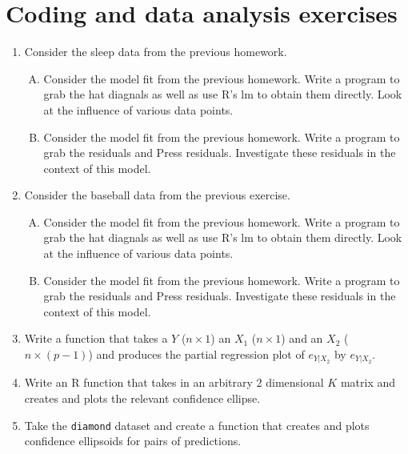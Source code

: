 \documentclass[12pt]{article}
\begin{document}
\section{Coding and data analysis exercises}
\begin{enumerate}
	\item Consider the sleep data from the previous homework.
	\begin{enumerate}[A.]
 		\item Consider the model fit from the previous homework. Write a program to grab the hat diagnals as well as use R's lm to obtain them directly. 
 			Look at the influence of various data points.
		\item Consider the model fit from the previous homework. Write a program to grab the residuals and Press residuals. Investigate these residuals
	   in the context of this model.
   \end{enumerate}
   \item Consider the baseball data from the previous exercise.
	\begin{enumerate}[A.]
		\item Consider the model fit from the previous homework. Write a program to grab the hat diagnals as well as use R's lm to obtain them directly. 
		Look at the influence of various data points.
		\item Consider the model fit from the previous homework. Write a program to grab the residuals and Press residuals. Investigate these residuals
		in the context of this model.
	\end{enumerate}
	\item Write a function that takes a $Y$ ($n\times 1$) an $X_1$ ($n \times 1$) and an $X_2$ ($n \times (p-1)$) and produces the partial regression
		plot of $e_{Y | X_2}$ by $e_{Y | X_2}$.
	 \item Write an R function that takes in an arbitrary 2 dimensional $K$ matrix and creates and plots the relevant confidence ellipse.
	 \item Take the \texttt{diamond} dataset and create a function that creates and plots confidence ellipsoids for pairs of predictions.
\end{enumerate}
\end{document}
